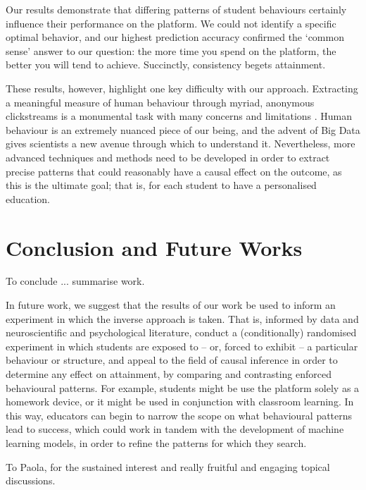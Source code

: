 \documentclass[sigplan,screen]{acmart}
\begin{document}
Our results demonstrate that differing patterns of student behaviours certainly influence their performance on the platform. We could not identify a specific optimal behavior, and our highest prediction accuracy confirmed the `common sense' answer to our question: the more time you spend on the platform, the better you will tend to achieve. Succinctly, consistency begets attainment. 

These results, however, highlight one key difficulty with our approach. Extracting a meaningful measure of human behaviour through myriad, anonymous clickstreams is a monumental task with many concerns and limitations \cite{meaningfulmeasures}. Human behaviour is an extremely nuanced piece of our being, and the advent of Big Data gives scientists a new avenue through which to understand it. Nevertheless, more advanced techniques and methods need to be developed in order to extract precise patterns that could reasonably have a causal effect on the outcome, as this is the ultimate goal; that is, for each student to have a personalised education. 





\section{Conclusion and Future Works}\label{sec:conclusion}

{\color{red} To conclude ... summarise work}.

In future work, we suggest that the results of our work be used to inform an experiment in which the inverse approach is taken. That is, informed by data and neuroscientific and psychological literature, conduct a (conditionally) randomised experiment in which students are exposed to -- or, forced to exhibit -- a particular behaviour or structure, and appeal to the field of causal inference in order to determine any effect on attainment, by comparing and contrasting enforced behavioural patterns. For example, students might be use the platform solely as a homework device, or it might be used in conjunction with classroom learning. In this way, educators can begin to narrow the scope on what behavioural patterns lead to success, which could work in tandem with the development of machine learning models, in order to refine the patterns for which they search. 



\begin{acks}
To Paola, for the sustained interest and really fruitful and engaging topical discussions.
\end{acks}
\end{document}
